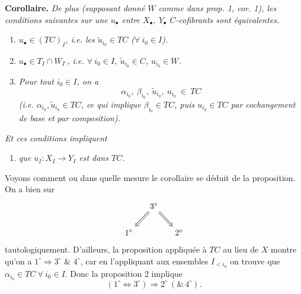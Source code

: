 \textbf{Corollaire.} \textit{De plus (supposant donné $W$ comme dans prop. 1, cor. 1), les conditions suivantes sur une $u_{\bullet}$ entre $X_{\bullet}$, $Y_{\bullet}$ $C$-cofibrants sont équivalentes.}
\begin{enumerate}
\item[$1^{\circ}$)] \textit{$u_{\bullet} \in (TC)_I$, i.e. les $\tilde{u}_{i_0} \in TC$ ($\forall\ i_0 \in I$).}
\item[$2^{\circ}$)] \textit{$u_{\bullet} \in T_I \cap W_{I^{\circ}}$, i.e. $\forall\ i_0 \in I$, $\tilde{u}_{i_0} \in C$, $u_{i_0} \in W$.} %
\item[$3^{\circ}$)] \textit{Pour tout $i_0 \in I$, on a}
\[
\alpha_{i_0},\ \beta_{i_0},\ \tilde{u}_{i_0},\ u_{i_0} \ \in \ TC
\]
\textit{(i.e. $\alpha_{i_0}, \tilde{u}_{i_0} \in TC$, ce qui implique $\beta_{i_0} \in TC$, puis $u_{i_0} \in TC$ par cochangement de base et par composition).}
\end{enumerate}
\textit{Et ces conditions impliquent}
\begin{enumerate}
\item[$4^{\circ}$)] \textit{que $u_I : X_I \longrightarrow Y_I$ est dans $TC$.}
\end{enumerate}

Voyons comment ou dans quelle mesure le corollaire se déduit de la proposition. On a bien sur %
\[
\begin{tikzcd}[column sep=small]
& 3^{\circ} \arrow[dl, Rightarrow] \arrow[dr, Rightarrow] & \\
1^{\circ} & & 2^{\circ}
\end{tikzcd}
\]
tautologiquement. D'ailleurs, la proposition appliquée à $TC$ au lieu de $X$ montre qu'on a $1^{\circ} \Longrightarrow 3^{\circ}$ \& $4^{\circ}$, car en l'appliquant aux ensembles $I_{<i_0}$ on trouve que $\alpha_{i_0} \in TC\ \forall\ i_0 \in I$. Donc la proposition 2 implique %
\[
(1^{\circ} \Longleftrightarrow 3^{\circ}) \Longrightarrow 2^{\circ}\ (\&\ 4^{\circ}).
\]


